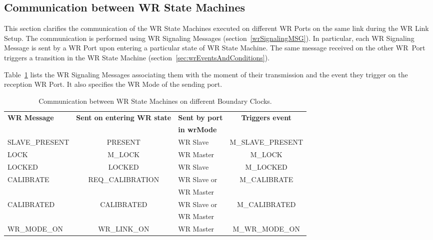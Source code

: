 \documentclass[a4paper, 12pt]{article}
\begin{document}
\newpage

\subsection{Communication between WR State Machines}
\label{sec:communicationWRfsm}

This section clarifies the communication of the WR State Machines executed on different WR Ports 
on the same link during the WR Link Setup. The communication is performed using WR Signaling Messages
(section~\ref{wrSignalingMSG}). In particular, each WR Signaling Message is sent by a WR Port 
upon entering a particular state of WR State Machine. The same message received on the other WR~Port 
triggers a transition in the WR State Machine (section~\ref{sec:wrEventsAndConditions}).

Table~\ref{tab:wrMsgVsEvents} lists the WR Signaling Messages associating them with the moment 
of their transmission and the event they trigger on the reception WR Port. 
It also specifies the WR Mode of the sending port.


\begin{table}[ph!]
\caption{Communication between WR State Machines on different Boundary Clocks.}
\centering
\begin{tabular}{| l | c | p{2.5cm} | c |}          \hline

\textbf{WR Message} &\textbf{Sent on entering WR state} & \textbf{Sent by port} & 
\textbf{Triggers event}    \\ 
               &             	  & \textbf{in wrMode} 	  &  			           \\ \hline
SLAVE\_PRESENT & PRESENT     	  & WR Slave		  & M\_SLAVE\_PRESENT	           \\ \hline
LOCK           & M\_LOCK      	  & WR Master		  & M\_LOCK		           \\ \hline
LOCKED         & LOCKED	     	  & WR Slave		  & M\_LOCKED		           \\ \hline
CALIBRATE      & REQ\_CALIBRATION & WR Slave or 	  & M\_CALIBRATE	           \\ 
	       & 		  & WR Master 		  & 			           \\ \hline
CALIBRATED     & CALIBRATED	  & WR Slave or 	  & M\_CALIBRATED	           \\ 
	       & 		  & WR Master 		  & 			           \\ \hline
WR\_MODE\_ON   & WR\_LINK\_ON     & WR Master 		  & M\_WR\_MODE\_ON	           \\ \hline
\end{tabular}
\label{tab:wrMsgVsEvents}
\end{table}
\end{document}
